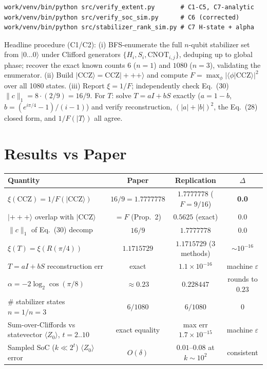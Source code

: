 \documentclass[11pt]{article}
\begin{document}
\begin{verbatim}
work/venv/bin/python src/verify_extent.py       # C1-C5, C7-analytic
work/venv/bin/python src/verify_soc_sim.py      # C6 (corrected)
work/venv/bin/python src/stabilizer_rank_sim.py # C7 H-state + alpha
\end{verbatim}

Headline procedure (C1/C2): (i) BFS-enumerate the full $n$-qubit stabilizer set from
$|0\ldots 0\rangle$ under Clifford generators $\{H_i, S_i, \mathrm{CNOT}_{i,j}\}$, deduping
up to global phase; recover the exact known counts $6$ ($n=1$) and $1080$ ($n=3$),
validating the enumerator. (ii) Build $|\mathrm{CCZ}\rangle = \mathrm{CCZ}|{+}{+}{+}\rangle$
and compute $F = \max_\phi |\langle\phi|\mathrm{CCZ}\rangle|^2$ over all 1080 states.
(iii) Report $\xi = 1/F$; independently check Eq.~(30) $\|c\|_1 = 8 \cdot (2/9) = 16/9$.
For $T$: solve $T = aI + bS$ exactly ($a = 1 - b$, $b = (e^{i\pi/4} - 1)/(i - 1)$) and
verify reconstruction, $(|a|+|b|)^2$, the Eq.~(28) closed form, and $1/F(|T\rangle)$ all agree.

\section{Results vs Paper}

\begin{center}
\begin{tabular}{lccc}
\toprule
Quantity & Paper & Replication & $\Delta$ \\
\midrule
$\xi(\mathrm{CCZ}) = 1/F(|\mathrm{CCZ}\rangle)$ & $16/9 = 1.7777778$ & $1.7777778$ ($F = 9/16$) & \textbf{0.0} \\
$|{+}{+}{+}\rangle$ overlap with $|\mathrm{CCZ}\rangle$ & $= F$ (Prop.~2) & $0.5625$ (exact) & $0.0$ \\
$\|c\|_1$ of Eq.~(30) decomp & $16/9$ & $1.7777778$ & $0.0$ \\
$\xi(T) = \xi(R(\pi/4))$ & $1.1715729$ & $1.1715729$ (3 methods) & $\sim 10^{-16}$ \\
$T = aI + bS$ reconstruction err & exact & $1.1\!\times\!10^{-16}$ & machine $\varepsilon$ \\
$\alpha = -2\log_2\cos(\pi/8)$ & $\approx 0.23$ & $0.228447$ & rounds to $0.23$ \\
$\#$ stabilizer states $n=1 / n=3$ & $6 / 1080$ & $6 / 1080$ & $0$ \\
Sum-over-Cliffords vs statevector $\langle Z_0\rangle$, $t{=}2..10$ & exact equality & max err $1.7\!\times\!10^{-15}$ & machine $\varepsilon$ \\
Sampled SoC ($k\ll 2^t$) $\langle Z_0\rangle$ error & $O(\delta)$ & $0.01$--$0.08$ at $k \sim 10^2$ & consistent \\
\bottomrule
\end{tabular}
\end{center}
\end{document}
